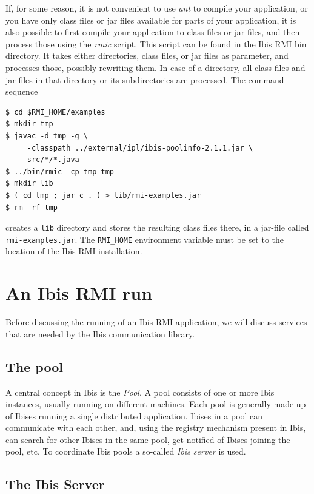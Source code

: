 \documentclass[a4paper,10pt]{article}
\begin{document}
If, for some reason, it is not convenient to use \emph{ant} to compile
your application, or you have only class files or jar files available
for parts of your application, it is also possible to first compile
your application to class files or jar files, and then process those
using the \emph{rmic} script. This script can be found in the Ibis RMI
bin directory. It takes either directories, class files, or jar files
as parameter, and processes those, possibly rewriting them. In case
of a directory, all class files and jar files in that directory or
its subdirectories are processed.  The command sequence

\begin{verbatim}
$ cd $RMI_HOME/examples
$ mkdir tmp
$ javac -d tmp -g \
     -classpath ../external/ipl/ibis-poolinfo-2.1.1.jar \
     src/*/*.java
$ ../bin/rmic -cp tmp tmp
$ mkdir lib
$ ( cd tmp ; jar c . ) > lib/rmi-examples.jar
$ rm -rf tmp
\end{verbatim}

creates a \texttt{lib} directory and stores the resulting class files there,
in a jar-file called \texttt{rmi-examples.jar}.
The \texttt{RMI\_HOME} environment variable must be set to the location of
the Ibis RMI installation.

\section{An Ibis RMI run}

Before discussing
the running of an Ibis RMI application, we will discuss services that are
needed by the Ibis communication library.

\subsection{The pool}

A central concept in Ibis is the \emph{Pool}. A pool consists of one or
more Ibis instances, usually running on different machines. Each pool is
generally made up of Ibises running a single distributed application.
Ibises in a pool can communicate with each other, and, using the
registry mechanism present in Ibis, can search for other Ibises in the
same pool, get notified of Ibises joining the pool, etc. To
coordinate Ibis pools a so-called \emph{Ibis server} is used.

\subsection{The Ibis Server}
\end{document}
